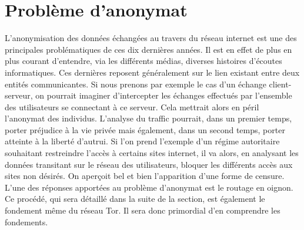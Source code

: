 \documentclass[letterpaper]{article}
\begin{document}
\section{Problème d'anonymat}
L'anonymisation des données échangées au travers du réseau internet est une des principales problématiques de ces dix dernières années. Il est en effet de plus en plus courant d'entendre, via les différents médias, diverses histoires d'écoutes informatiques. Ces dernières reposent généralement sur le lien existant entre deux entités communicantes. Si nous prenons par exemple le cas d'un échange client-serveur, on pourrait imaginer d'intercepter les échanges effectués par l'ensemble des utilisateurs se connectant à ce serveur. Cela mettrait alors en péril l'anonymat des individus. L'analyse du traffic pourrait, dans un premier temps, porter préjudice à la vie privée mais également, dans un second temps, porter atteinte à la liberté d'autrui. Si l'on prend l'exemple d'un régime autoritaire souhaitant restreindre l'accès à certains sites internet, il va alors, en analysant les données transitant sur le réseau des utilisateurs, bloquer les différents accès aux sites non désirés. On aperçoit bel et bien l'apparition d'une forme de censure. L'une des réponses apportées au problème d'anonymat est le routage en oignon. Ce procédé, qui sera détaillé dans la suite de la section, est également le fondement même du réseau Tor. Il sera donc primordial d'en comprendre les fondements.
\end{document}
